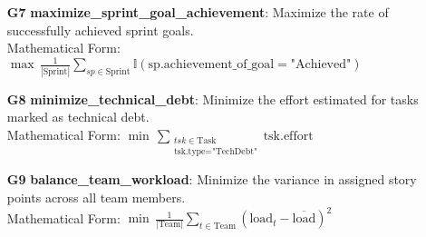 \documentclass[11pt]{article}
\begin{document}
\begin{itemize}
    \item[\textbf{G7}] \textbf{maximize\_sprint\_goal\_achievement}: Maximize the rate of successfully achieved sprint goals. \\
    Mathematical Form: $\max\, \frac{1}{|\text{Sprint}|} \sum_{sp \in \text{Sprint}} \mathbb{I}(\text{sp.achievement\_of\_goal} = \text{"Achieved"})$

    \item[\textbf{G8}] \textbf{minimize\_technical\_debt}: Minimize the effort estimated for tasks marked as technical debt. \\
    Mathematical Form: $\min\, \sum_{\substack{tsk \in \text{Task} \\ \text{tsk.type} = \text{"TechDebt"}}} \text{tsk.effort}$

    \item[\textbf{G9}] \textbf{balance\_team\_workload}: Minimize the variance in assigned story points across all team members. \\
    Mathematical Form: $\min\, \frac{1}{|\text{Team}|} \sum_{t \in \text{Team}} \left( \text{load}_t - \overline{\text{load}} \right)^2$
\end{itemize}
\end{document}
